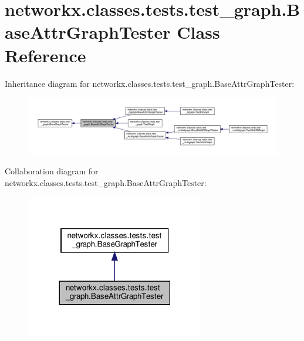 \hypertarget{classnetworkx_1_1classes_1_1tests_1_1test__graph_1_1BaseAttrGraphTester}{}\section{networkx.\+classes.\+tests.\+test\+\_\+graph.\+Base\+Attr\+Graph\+Tester Class Reference}
\label{classnetworkx_1_1classes_1_1tests_1_1test__graph_1_1BaseAttrGraphTester}


Inheritance diagram for networkx.\+classes.\+tests.\+test\+\_\+graph.\+Base\+Attr\+Graph\+Tester\+:
\nopagebreak
\begin{figure}[H]
\begin{center}
\leavevmode
\includegraphics[width=350pt]{classnetworkx_1_1classes_1_1tests_1_1test__graph_1_1BaseAttrGraphTester__inherit__graph}
\end{center}
\end{figure}


Collaboration diagram for networkx.\+classes.\+tests.\+test\+\_\+graph.\+Base\+Attr\+Graph\+Tester\+:
\nopagebreak
\begin{figure}[H]
\begin{center}
\leavevmode
\includegraphics[width=221pt]{classnetworkx_1_1classes_1_1tests_1_1test__graph_1_1BaseAttrGraphTester__coll__graph}
\end{center}
\end{figure}
